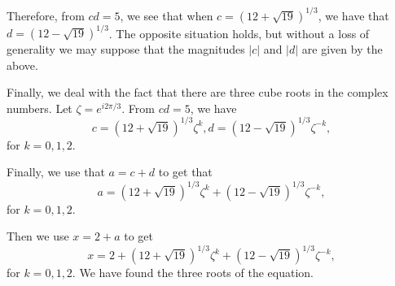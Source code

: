 \begin{enumerate}
Therefore, from \(cd = 5\), we see that when \(c = \left(12 + \sqrt{19}\right)^{1/3}\), we have that 
\(d = \left(12 - \sqrt{19}\right)^{1/3}\). The opposite situation holds, but without a loss of generality
we may suppose that the magnitudes \(|c|\) and \(|d|\) are given by the above.

Finally, we deal with the fact that there are three cube roots in the complex numbers. Let \(\zeta = e^{i2\pi / 3}\).
From \(cd = 5\), we have
\begin{equation}
c = \left(12 + \sqrt{19}\right)^{1/3} \zeta^k, d = \left(12 - \sqrt{19}\right)^{1/3} \zeta^{-k},
\end{equation}
for \(k = 0, 1, 2\).

Finally, we use that \(a = c + d\) to get that
\begin{equation}
a = \left(12 + \sqrt{19}\right)^{1/3} \zeta^k + \left(12 - \sqrt{19}\right)^{1/3} \zeta^{-k},
\end{equation}
for \(k = 0, 1, 2\). 

Then we use \(x = 2 + a\) to get
\begin{equation}
x = 2 + \left(12 + \sqrt{19}\right)^{1/3} \zeta^k + \left(12 - \sqrt{19}\right)^{1/3} \zeta^{-k},
\end{equation}
for \(k = 0, 1, 2\). We have found the three roots of the equation. 

\end{enumerate}
